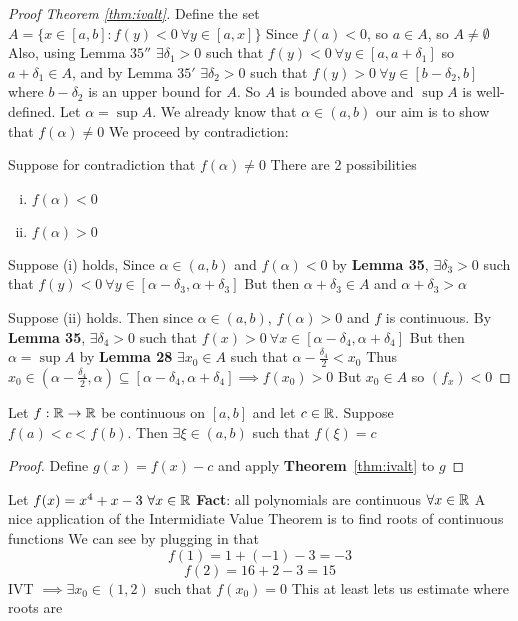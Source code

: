 \begin{proof}[Proof Theorem \ref{thm:ivalt}]
    Define the set $A=\{x \in \left[a, b\right]:f(y) < 0\ \forall y \in \left[a, x\right]\}$
    Since $f(a) < 0$, so $a \in A$, so $A \neq \emptyset$
    Also, using Lemma $35''$ $\exists \delta_1 > 0$ such that $f(y) < 0\ \forall y \in \left[a, a + \delta_1\right]$
    so $a + \delta_1 \in A$, and by Lemma $35'$ 
    $\exists \delta_2 > 0$ such that $f(y) > 0\ \forall y \in \left[b-\delta_2, b\right]$ where $b-\delta_2$ is an upper bound for $A$.
    So $A$ is bounded above and $\sup A$ is well-defined.
    Let $\alpha=\sup A$. We already know that $\alpha\in (a, b)$
    our aim is to show that $f(\alpha) \neq 0$
    We proceed by contradiction: 
    
    Suppose for contradiction that $f(\alpha) \neq 0$
    There are 2 possibilities
    \begin{enumerate}[(i)]
        \item $f(\alpha) < 0$
        \item $f(\alpha) > 0$
    \end{enumerate}
    Suppose (i) holds, Since $\alpha \in (a, b)$ and $f(\alpha) < 0$
    by \textbf{Lemma 35}, $\exists \delta_3 > 0$ such that $f(y) < 0\ \forall y \in \left[\alpha - \delta_3, \alpha + \delta_3\right]$
    But then $\alpha + \delta_3 \in A$ and $\alpha + \delta_3 > \alpha$

    Suppose (ii) holds. Then since $\alpha \in (a, b)$, $f(\alpha) > 0$ and $f$ is continuous. By \textbf{Lemma 35}, $\exists \delta_4 > 0$ such that $f(x) > 0\ \forall x \in \left[\alpha - \delta_4, \alpha+\delta_4\right]$
    But then $\alpha = \sup A$ by \textbf{Lemma 28} $\exists x_0 \in A$ such that $\alpha - \frac{\delta_4}{2} < x_0$
    Thus $x_0 \in (\alpha-\frac{\delta_4}{2}, \alpha) \subseteq \left[\alpha - \delta_4, \alpha+\delta_4\right] \implies f(x_0) > 0$
    But $x_0 \in A$ so $(f_x) < 0$
\end{proof}

\begin{corollary}
    Let $f: \mathbb R \rightarrow \mathbb R$ be continuous on $\left[a, b\right]$ and let $c\in\mathbb R$.
    Suppose $f(a) < c < f(b)$. Then $\exists\xi \in (a, b)$ such that $f(\xi)=c$
\end{corollary}
\begin{proof}
    Define $g(x) = f(x) - c$ and apply \textbf{Theorem}~\ref{thm:ivalt} to $g$
\end{proof}

\begin{example}
    Let $f(x) = x^4 + x - 3\ \forall x \in \mathbb R$
    \textbf{Fact}: all polynomials are continuous $\forall x \in \mathbb R$
    A nice application of the Intermidiate Value Theorem is to find roots of continuous functions
    We can see by plugging in that 
    $$ f(1) = 1 + (-1) - 3 = -3$$
    $$ f(2) = 16 + 2 - 3 = 15$$
    IVT $\implies \exists x_0 \in (1, 2)$ such that $f(x_0) = 0$
    This  at least lets us estimate where roots are
\end{example}

